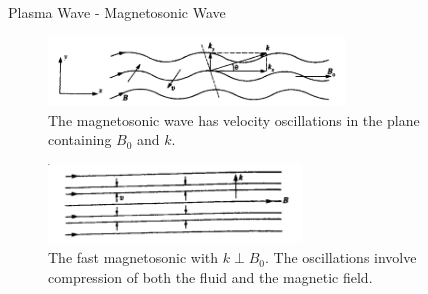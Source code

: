 \begin{frame}{Plasma Wave - Magnetosonic Wave}
    \begin{figure}
        \centering
        \includegraphics[width=0.7\textwidth]{figures/magnetosonic-wave.png}
        \caption{The magnetosonic wave has velocity oscillations in the plane containing $B_0$ and $k$.}
        \label{fig:magnetosonic-wave}
    \end{figure}
    \begin{figure}
        \centering
        \includegraphics[width=0.6\textwidth]{figures/magnetosonic-wave-fast.png}
        \caption{The fast magnetosonic with $k\perp B_0$. The oscillations involve compression of both the fluid and the magnetic field.}
        \label{fig:magnetosonic-wave-fast}
    \end{figure}
\end{frame}